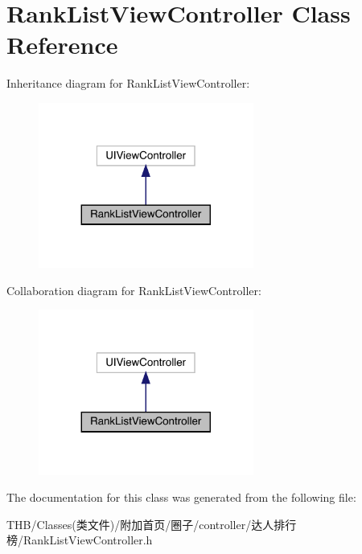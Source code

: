 \hypertarget{interface_rank_list_view_controller}{}\section{Rank\+List\+View\+Controller Class Reference}
\label{interface_rank_list_view_controller}


Inheritance diagram for Rank\+List\+View\+Controller\+:\nopagebreak
\begin{figure}[H]
\begin{center}
\leavevmode
\includegraphics[width=200pt]{interface_rank_list_view_controller__inherit__graph}
\end{center}
\end{figure}


Collaboration diagram for Rank\+List\+View\+Controller\+:\nopagebreak
\begin{figure}[H]
\begin{center}
\leavevmode
\includegraphics[width=200pt]{interface_rank_list_view_controller__coll__graph}
\end{center}
\end{figure}


The documentation for this class was generated from the following file\+:\begin{DoxyCompactItemize}
\item 
T\+H\+B/\+Classes(类文件)/附加首页/圈子/controller/达人排行榜/Rank\+List\+View\+Controller.\+h\end{DoxyCompactItemize}
